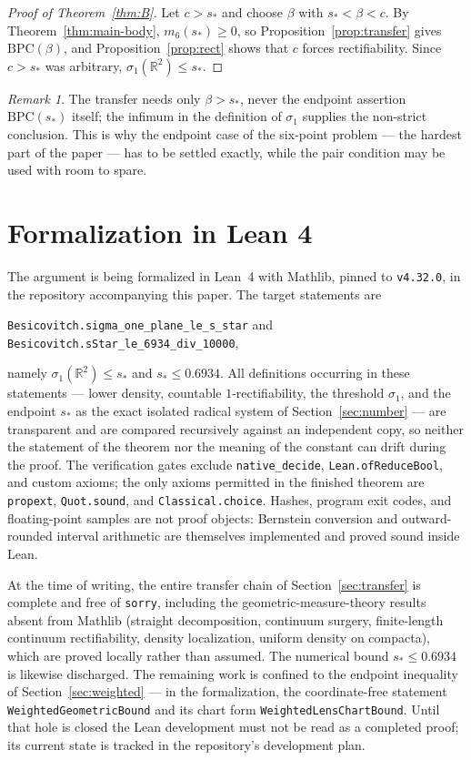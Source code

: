 \documentclass[11pt]{article}
\theoremstyle{plain}
\theoremstyle{definition}
\theoremstyle{remark}
\newtheorem{remark}[theorem]{Remark}
\newcommand{\R}{\mathbb R}
\newcommand{\sstar}{s_{\!*}}
\begin{document}
\begin{proof}[Proof of Theorem~\ref{thm:B}]
Let $c>\sstar$ and choose $\beta$ with $\sstar<\beta<c$.  By
Theorem~\ref{thm:main-body}, $m_6(\sstar)\ge0$, so
Proposition~\ref{prop:transfer} gives $\mathrm{BPC}(\beta)$, and
Proposition~\ref{prop:rect} shows that $c$ forces rectifiability.  Since
$c>\sstar$ was arbitrary, $\sigma_1(\R^2)\le\sstar$.
\end{proof}

\begin{remark}
The transfer needs only $\beta>\sstar$, never the endpoint assertion
$\mathrm{BPC}(\sstar)$ itself; the infimum in the definition of $\sigma_1$
supplies the non-strict conclusion.  This is why the endpoint case of the
six-point problem --- the hardest part of the paper --- has to be settled
exactly, while the pair condition may be used with room to spare.
\end{remark}

\section{Formalization in Lean 4}\label{sec:lean}

The argument is being formalized in Lean~4 with Mathlib, pinned to
\texttt{v4.32.0}, in the repository accompanying this paper.  The target
statements are
\begin{center}
\texttt{Besicovitch.sigma\_one\_plane\_le\_s\_star} \quad and \quad
\texttt{Besicovitch.sStar\_le\_6934\_div\_10000},
\end{center}
namely $\sigma_1(\R^2)\le\sstar$ and $\sstar\le0.6934$.  All definitions
occurring in these statements --- lower density, countable
$1$-rectifiability, the threshold $\sigma_1$, and the endpoint $\sstar$ as
the exact isolated radical system of Section~\ref{sec:number} --- are
transparent and are compared recursively against an independent copy, so
neither the statement of the theorem nor the meaning of the constant can
drift during the proof.  The verification gates exclude
\texttt{native\_decide}, \texttt{Lean.ofReduceBool}, and custom axioms; the
only axioms permitted in the finished theorem are \texttt{propext},
\texttt{Quot.sound}, and \texttt{Classical.choice}.  Hashes, program exit
codes, and floating-point samples are not proof objects: Bernstein
conversion and outward-rounded interval arithmetic are themselves
implemented and proved sound inside Lean.

At the time of writing, the entire transfer chain of
Section~\ref{sec:transfer} is complete and free of \texttt{sorry},
including the geometric-measure-theory results absent from Mathlib
(straight decomposition, continuum surgery, finite-length continuum
rectifiability, density localization, uniform density on compacta), which
are proved locally rather than assumed.  The numerical bound
$\sstar\le0.6934$ is likewise discharged.  The remaining work is confined
to the endpoint inequality of Section~\ref{sec:weighted} --- in the
formalization, the coordinate-free statement
\texttt{WeightedGeometricBound} and its chart form
\texttt{WeightedLensChartBound}.  Until that hole is closed the Lean
development must not be read as a completed proof; its current state is
tracked in the repository's development plan.
\end{document}
